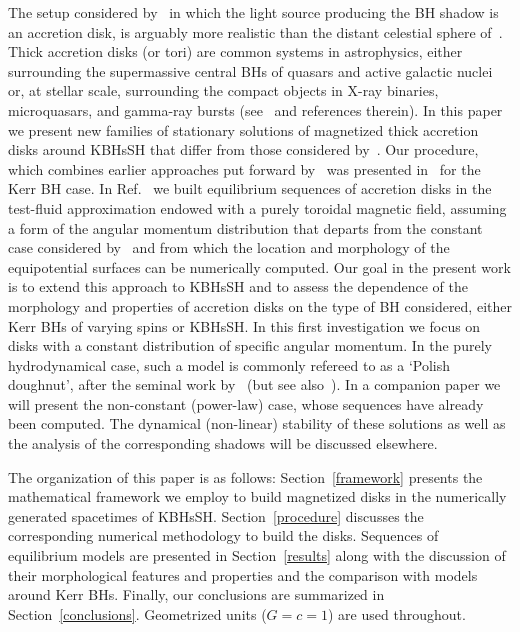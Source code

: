 \documentclass[twocolumn,aps,showpacs,showkeys,prd,superscriptaddress,byrevtex, amsmath]{revtex4-1}
\begin{document}
The setup considered by~\cite{Vincent:2016} in which the light source producing the BH shadow is an accretion disk, is arguably more realistic than the distant celestial sphere of~\cite{Cunha:2015}. Thick accretion disks (or tori) are common systems in astrophysics, either surrounding the supermassive central BHs of quasars and active galactic nuclei or, at  stellar scale, surrounding the compact objects in X-ray binaries, microquasars, and gamma-ray bursts (see~\cite{Abramowicz:2013} and references therein). In this paper we present new families of stationary solutions of magnetized thick accretion disks around KBHsSH that differ from those considered by~\cite{Vincent:2016}. Our procedure, which combines earlier approaches put forward by~\cite{Komissarov:2006,Qian:2009} was presented in~\cite{Gimeno-Soler:2017} for the Kerr BH case. In Ref.~\cite{Gimeno-Soler:2017} we built equilibrium sequences of accretion disks  in the test-fluid approximation endowed with a purely toroidal magnetic field, assuming a form of the angular momentum distribution that departs from the constant case considered by~\cite{Komissarov:2006} and from which the location and morphology of the equipotential surfaces can be numerically computed. Our goal in the present work is to extend this approach to KBHsSH and to assess the dependence of the morphology and properties of accretion disks on the type of BH considered, either Kerr BHs of varying spins or KBHsSH. In this first investigation we focus on disks with a constant distribution of specific angular momentum. In the  purely hydrodynamical case, such a model is commonly refereed to as a `Polish doughnut', after the seminal work by~\cite{Abramowicz:1978} (but see also~\cite{Fishbone:1976}). In a companion paper we will present the non-constant (power-law) case, whose sequences have already been computed. The dynamical (non-linear) stability of these solutions as well as the analysis of the corresponding shadows will be discussed elsewhere.

The organization of this paper is as follows: Section~\ref{framework} presents  the mathematical framework we employ to build magnetized disks in the numerically generated spacetimes of KBHsSH. Section~\ref{procedure} discusses the corresponding numerical methodology to build the disks. Sequences of equilibrium models are presented in Section~\ref{results} along with the discussion of their morphological features and properties and the comparison with models around Kerr BHs. Finally, our conclusions are summarized in Section~\ref{conclusions}. Geometrized units ($G=c=1$) are used throughout. 
 
\end{document}
